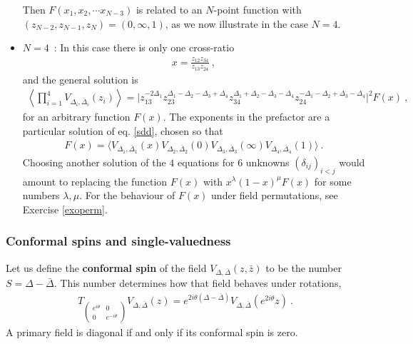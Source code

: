 \documentclass[12pt, a4paper, notitlepage, twoside]{report}
\numberwithin{equation}{section}
\theoremstyle{break}
\begin{document}
\begin{itemize}
Then $F(x_1,x_2,\cdots x_{N-3})$ is related to an $N$-point function with $(z_{N-2},z_{N-1},z_N)=(0,\infty,1)$, as we now illustrate in the case $N=4$.

\item $\boxed{N=4}$\ : In this case there is only one cross-ratio 
\begin{align}
 x=\frac{z_{12}z_{34}}{z_{13}z_{24}}\ ,
\label{xe}
\end{align}
and the general solution is 
\begin{align}
 \left\langle\prod_{i=1}^4 V_{\Delta_i,\bar\Delta_i}(z_i)\right\rangle = \Big| 
 z_{13}^{-2\Delta_1}z_{23}^{\Delta_1-\Delta_2-\Delta_3+\Delta_4}
 z_{34}^{\Delta_1+\Delta_2-\Delta_3-\Delta_4} z_{24}^{-\Delta_1-\Delta_2+\Delta_3-\Delta_4}
 \Big|^2 F(x)\ ,
\label{zgg}
\end{align}
for an arbitrary function $F(x)$.
The exponents in the prefactor are a particular solution of eq. \eqref{sdd}, chosen so that 
\begin{align}
 F(x) =\Big\langle V_{\Delta_1,\bar\Delta_1}(x)V_{\Delta_2,\bar\Delta_2}(0)V_{\Delta_3,\bar\Delta_3}(\infty) V_{\Delta_4,\bar\Delta_4}(1)\Big\rangle \ .
\label{fx}
\end{align}
Choosing another solution of the $4$ equations for $6$ unknowns $(\delta_{ij})_{i<j}$ would amount to replacing the function $F(x)$ with $x^\lambda (1-x)^\mu F(x)$ for some numbers $\lambda,\mu$. For the behaviour of $F(x)$ under field permutations, see Exercise \ref{exoperm}.
\end{itemize}

\subsubsection{Conformal spins and single-valuedness}

Let us define the \textbf{conformal spin} of the field $V_{\Delta,\bar\Delta}(z,\bar z)$ to be the number $S=\Delta-\bar\Delta$. This number determines how that field behaves under rotations, 
\begin{align}
 T_{\left(\begin{smallmatrix} e^{i\theta} & 0 \\ 0 & e^{-i\theta} \end{smallmatrix}\right)} V_{\Delta,\bar{\Delta}}(z) = e^{2i\theta(\Delta-\bar\Delta)} V_{\Delta,\bar{\Delta}}(e^{2i\theta} z)\ .
\end{align}
A primary field is diagonal if and only if its conformal spin is zero.
\end{document}
